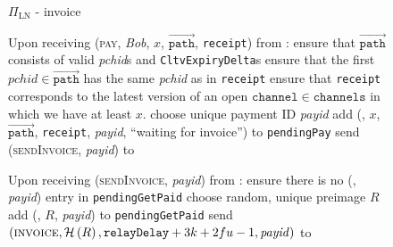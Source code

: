   \begin{figure}[H]
    \begin{protocolbox}{$\Pi_{\mathrm{LN}}$ - invoice}
      \begin{algorithmic}[1]
        \State Upon receiving (\textsc{pay}, \textit{Bob}, $x$,
        $\overrightarrow{\mathtt{path}}$, \texttt{receipt}) from \environment:
        \Indent
          \State ensure that $\overrightarrow{\mathtt{path}}$ consists of valid
          \textit{pchid}s and \texttt{CltvExpiryDelta}s 
          \State ensure that the first $\mathit{pchid} \in
          \overrightarrow{\mathtt{path}}$ has the same \textit{pchid} as in
          \texttt{receipt}
          \State ensure that \texttt{receipt} corresponds to the latest version
          of an open $\mathtt{channel} \in \mathtt{channels}$ in which we have
          at least $x$.
          \State choose unique payment ID \textit{payid} 
          \State add (\bob, $x$, $\overrightarrow{\mathtt{path}}$,
          \texttt{receipt}, \textit{payid}, ``waiting for invoice'') to
          \texttt{pendingPay}
          \State send (\textsc{sendInvoice}, \textit{payid}) to \bob{}
        \EndIndent
        \Statex

        \State Upon receiving (\textsc{sendInvoice}, \textit{payid}) from \bob:
        \Indent
          \State ensure there is no (\bob, \textit{payid}) entry in
          \texttt{pendingGetPaid}
          \State choose random, unique preimage $R$
          \State add (\bob, $R$, \textit{payid}) to \texttt{pendingGetPaid}
          \State send $\left(\textsc{invoice}, \mathcal{H}\left(R\right),
          \mathtt{relayDelay} + 3k + 2fu{} - 1, \mathit{payid}\right)$ to
          \bob{}
        \EndIndent
        \Statex


\end{algorithmic}
\end{protocolbox}
\end{figure}
